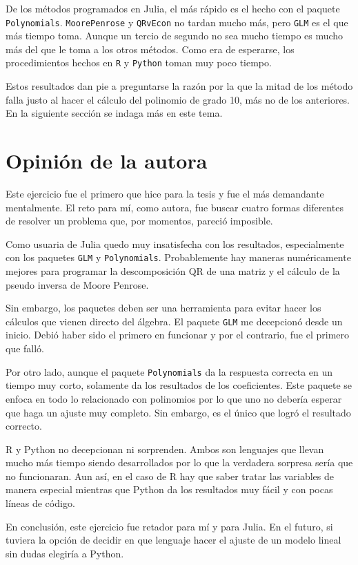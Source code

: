 De los métodos programados en \textsf{Julia}, el más rápido es el hecho con el paquete \texttt{Polynomials}. \texttt{MoorePenrose} y \texttt{QRvEcon} no tardan mucho más, pero \texttt{GLM} es el que más tiempo toma. Aunque un tercio de segundo no sea mucho tiempo es mucho más del que le toma a los otros métodos. Como era de esperarse, los procedimientos hechos en \texttt{R} y \texttt{Python} toman muy poco tiempo. 

Estos resultados dan pie a preguntarse la razón por la que la mitad de los método falla justo al hacer el cálculo del polinomio de grado 10, más no de los anteriores. En la siguiente sección se indaga más en este tema. 


\section{Opinión de la autora}

Este ejercicio fue el primero que hice para la tesis y fue el más demandante 
mentalmente. El reto para mí, como autora, fue buscar cuatro formas diferentes de resolver un problema que, por momentos, pareció imposible. 

Como usuaria de \textsf{Julia} quedo muy insatisfecha con los resultados, especialmente con los paquetes \texttt{GLM} y \texttt{Polynomials}. Probablemente hay maneras numéricamente mejores para programar la descomposición QR de una matriz y el cálculo de la pseudo inversa de Moore Penrose.

Sin embargo, los paquetes deben ser una herramienta para evitar hacer los cálculos que vienen directo del álgebra. El paquete \texttt{GLM} me decepcionó desde un inicio. Debió haber sido el primero en funcionar y por el contrario, fue el primero que falló. 

Por otro lado, aunque el paquete \texttt{Polynomials} da la respuesta correcta en un tiempo muy corto, solamente da los resultados de los coeficientes. Este paquete se enfoca en todo lo relacionado con polinomios por lo que uno no debería esperar que haga un ajuste muy completo. Sin embargo, es el único que logró el resultado correcto. 

\textsf{R} y \textsf{Python} no decepcionan ni sorprenden. Ambos son lenguajes que llevan mucho más tiempo siendo desarrollados por lo que la verdadera sorpresa sería que no funcionaran. Aun así, en el caso de \textsf{R} hay que saber tratar las variables de manera especial mientras que \textsf{Python} da los resultados muy fácil y con pocas líneas de código. 

En conclusión, este ejercicio fue retador para mí y para \textsf{Julia}. En el futuro, si tuviera la opción de decidir en que lenguaje hacer el ajuste de un modelo lineal sin dudas elegiría a \textsf{Python}. 







